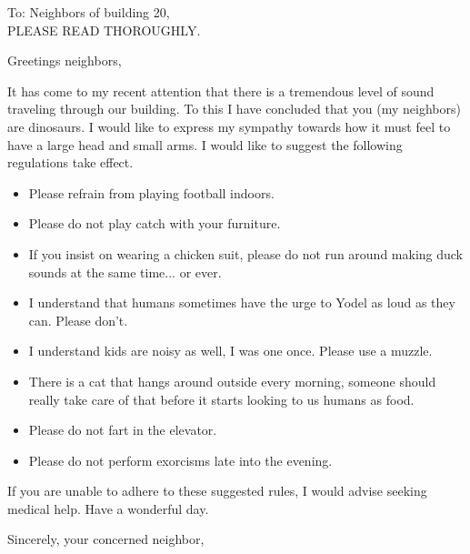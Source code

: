 \documentclass[]{letter}
\begin{document}

\begin{letter}{To: Neighbors of building 20,\\ PLEASE READ THOROUGHLY.}
	\address{STREET ADDRESS\\ ADDRESS LINE 2\\ CITY, STATE, ZIP-CODE}
	
	\opening{Greetings neighbors,}

It has come to my recent attention that there is a tremendous level of sound traveling through our building. To this I have concluded that you (my neighbors) are dinosaurs. I would like to express my sympathy towards how it must feel to have a large head and small arms. I would like to suggest the following regulations take effect.
\begin{itemize}
	\item Please refrain from playing football indoors.
	\item Please do not play catch with your furniture.
	\item If you insist on wearing a chicken suit, please do not run around making duck sounds at the same time... or ever.
	\item I understand that humans sometimes have the urge to Yodel as loud as they can. Please don't.
	\item I understand kids are noisy as well, I was one once. Please use a muzzle.
	\item There is a cat that hangs around outside every morning, someone should really take care of that before it starts looking to us humans as food.
	\item Please do not fart in the elevator.
	\item Please do not perform exorcisms late into the evening.
\end{itemize}
If you are unable to adhere to these suggested rules, I would advise seeking medical help. Have a wonderful day.
\signature{Neighbor}

\closing{Sincerely, your concerned neighbor,}


\end{letter}
\end{document}
